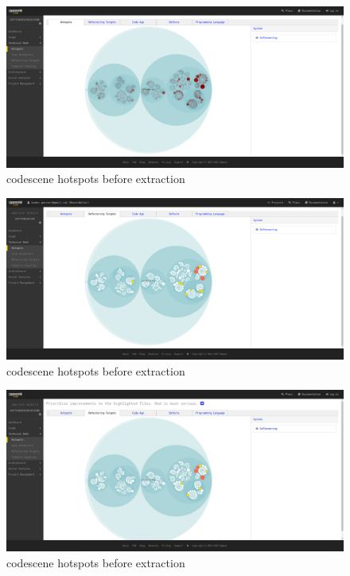 \documentclass{article}
\begin{document}
\begin{figure}[H]
\centering
	\includegraphics[width=\textwidth]{codescene/small/hotspots_after.png}
	\caption{codescene hotspots before extraction}
\end{figure}

\begin{figure}[H]
\centering
	\includegraphics[width=\textwidth]{codescene/small/ref_targs_before.png}
	\caption{codescene hotspots before extraction}
\end{figure}

\begin{figure}[H]
\centering
	\includegraphics[width=\textwidth]{codescene/small/ref_targs_after.png}
	\caption{codescene hotspots before extraction}
\end{figure}
\end{document}

